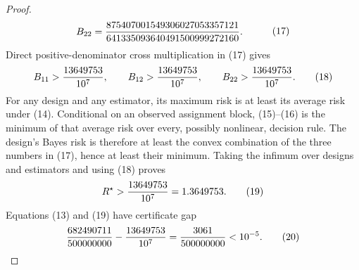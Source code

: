 \documentclass{article}
\begin{document}
\begin{proof}
\[\begin{split}
B_{22}&={875407001549306027053357121
\over641335093640491500999272160}.
\end{split}                                                                 \tag{17}
\]
Direct positive-denominator cross multiplication in (17) gives
\[
B_{11}>{13649753\over10^7},
\qquad B_{12}>{13649753\over10^7},
\qquad B_{22}>{13649753\over10^7}.                                         \tag{18}
\]
For any design and any estimator, its maximum risk is at least its average risk under (14).  Conditional on an observed assignment block, (15)--(16) is the minimum of that average risk over every, possibly nonlinear, decision rule.  The design's Bayes risk is therefore at least the convex combination of the three numbers in (17), hence at least their minimum.  Taking the infimum over designs and estimators and using (18) proves
\[
R^\star>{13649753\over10^7}=1.3649753.                                     \tag{19}
\]
Equations (13) and (19) have certificate gap
\[
{682490711\over500000000}-{13649753\over10^7}
={3061\over500000000}<10^{-5}.                                             \tag{20}
\]


\end{proof}
\end{document}
